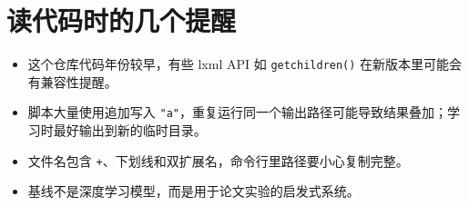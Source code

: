\documentclass[11pt,a4paper,fontset=fandol]{ctexart}
\newcommand{\code}[1]{\texttt{#1}}
\begin{document}
\section{读代码时的几个提醒}

\begin{itemize}[leftmargin=2em]
  \item 这个仓库代码年份较早，有些 lxml API 如 \code{getchildren()} 在新版本里可能会有兼容性提醒。
  \item 脚本大量使用追加写入 \code{"a"}，重复运行同一个输出路径可能导致结果叠加；学习时最好输出到新的临时目录。
  \item 文件名包含 \code{+}、下划线和双扩展名，命令行里路径要小心复制完整。
  \item 基线不是深度学习模型，而是用于论文实验的启发式系统。
\end{itemize}
\end{document}
